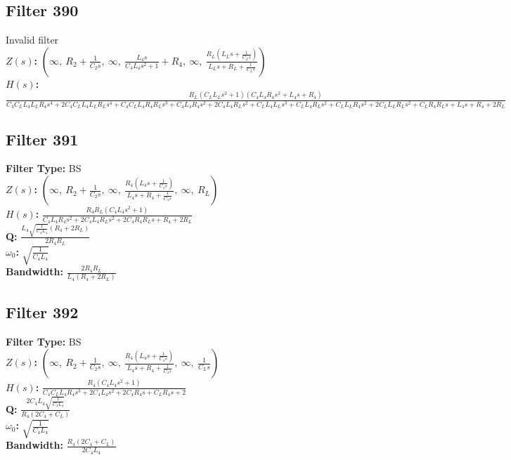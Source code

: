 \documentclass{article}
\begin{document}
\subsection*{Filter 390}
Invalid filter \\ 
\textbf{$Z(s)$:} $\left( \infty, \  R_{2} + \frac{1}{C_{2} s}, \  \infty, \  \frac{L_{4} s}{C_{4} L_{4} s^{2} + 1} + R_{4}, \  \infty, \  \frac{R_{L} \left(L_{L} s + \frac{1}{C_{L} s}\right)}{L_{L} s + R_{L} + \frac{1}{C_{L} s}}\right)$ \\ 
\textbf{$H(s)$:} $\frac{R_{L} \left(C_{L} L_{L} s^{2} + 1\right) \left(C_{4} L_{4} R_{4} s^{2} + L_{4} s + R_{4}\right)}{C_{4} C_{L} L_{4} L_{L} R_{4} s^{4} + 2 C_{4} C_{L} L_{4} L_{L} R_{L} s^{4} + C_{4} C_{L} L_{4} R_{4} R_{L} s^{3} + C_{4} L_{4} R_{4} s^{2} + 2 C_{4} L_{4} R_{L} s^{2} + C_{L} L_{4} L_{L} s^{3} + C_{L} L_{4} R_{L} s^{2} + C_{L} L_{L} R_{4} s^{2} + 2 C_{L} L_{L} R_{L} s^{2} + C_{L} R_{4} R_{L} s + L_{4} s + R_{4} + 2 R_{L}}$ \\ 
\subsection*{Filter 391}
\textbf{Filter Type:} BS \\ 
\textbf{$Z(s)$:} $\left( \infty, \  R_{2} + \frac{1}{C_{2} s}, \  \infty, \  \frac{R_{4} \left(L_{4} s + \frac{1}{C_{4} s}\right)}{L_{4} s + R_{4} + \frac{1}{C_{4} s}}, \  \infty, \  R_{L}\right)$ \\ 
\textbf{$H(s)$:} $\frac{R_{4} R_{L} \left(C_{4} L_{4} s^{2} + 1\right)}{C_{4} L_{4} R_{4} s^{2} + 2 C_{4} L_{4} R_{L} s^{2} + 2 C_{4} R_{4} R_{L} s + R_{4} + 2 R_{L}}$ \\ 
\textbf{Q:} $\frac{L_{4} \sqrt{\frac{1}{C_{4} L_{4}}} \left(R_{4} + 2 R_{L}\right)}{2 R_{4} R_{L}}$ \\ 
\textbf{$\omega_0$:} $\sqrt{\frac{1}{C_{4} L_{4}}}$ \\ 
\textbf{Bandwidth:} $\frac{2 R_{4} R_{L}}{L_{4} \left(R_{4} + 2 R_{L}\right)}$ \\ 
\subsection*{Filter 392}
\textbf{Filter Type:} BS \\ 
\textbf{$Z(s)$:} $\left( \infty, \  R_{2} + \frac{1}{C_{2} s}, \  \infty, \  \frac{R_{4} \left(L_{4} s + \frac{1}{C_{4} s}\right)}{L_{4} s + R_{4} + \frac{1}{C_{4} s}}, \  \infty, \  \frac{1}{C_{L} s}\right)$ \\ 
\textbf{$H(s)$:} $\frac{R_{4} \left(C_{4} L_{4} s^{2} + 1\right)}{C_{4} C_{L} L_{4} R_{4} s^{3} + 2 C_{4} L_{4} s^{2} + 2 C_{4} R_{4} s + C_{L} R_{4} s + 2}$ \\ 
\textbf{Q:} $\frac{2 C_{4} L_{4} \sqrt{\frac{1}{C_{4} L_{4}}}}{R_{4} \left(2 C_{4} + C_{L}\right)}$ \\ 
\textbf{$\omega_0$:} $\sqrt{\frac{1}{C_{4} L_{4}}}$ \\ 
\textbf{Bandwidth:} $\frac{R_{4} \left(2 C_{4} + C_{L}\right)}{2 C_{4} L_{4}}$ \\ 
\end{document}
